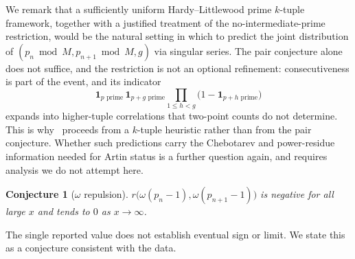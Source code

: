 \documentclass[11pt,reqno]{amsart}
\theoremstyle{plain}
\newtheorem{conjecture}[theorem]{Conjecture}
\theoremstyle{definition}
\begin{document}
We remark that a sufficiently uniform Hardy--Littlewood prime $k$-tuple
framework, together with a justified treatment of the no-intermediate-prime
restriction, would be the natural setting in which to predict the joint
distribution of $(p_n \bmod M, p_{n+1} \bmod M, g)$ via singular series. The
pair conjecture alone does not suffice, and the restriction is not an optional
refinement: consecutiveness is part of the event, and its indicator
\[
  \mathbf{1}_{p \text{ prime}} \, \mathbf{1}_{p+g \text{ prime}}
  \prod_{1 \le h < g} \bigl(1 - \mathbf{1}_{p+h \text{ prime}}\bigr)
\]
expands into higher-tuple correlations that two-point counts do not determine.
This is why~\cite{LOS2016} proceeds from a $k$-tuple heuristic rather than from
the pair conjecture. Whether such predictions carry the Chebotarev and
power-residue information needed for Artin status is a further question again,
and requires analysis we do not attempt here.

\begin{conjecture}[$\omega$ repulsion]
	\label{conj:omega}
	$r\bigl(\omega(p_n-1), \omega(p_{n+1}-1)\bigr)$ is negative for all large $x$
	and tends to $0$ as $x \to \infty$.
\end{conjecture}

The single reported value does not establish eventual sign or limit. We state
this as a conjecture consistent with the data.
\end{document}
